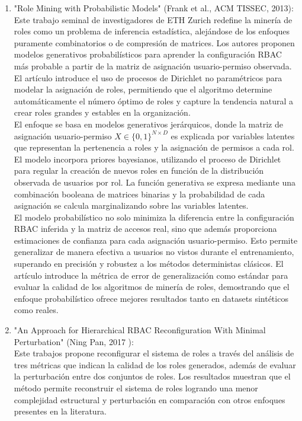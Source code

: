\documentclass[11pt,letterpaper]{article}
\begin{document}
\begin{enumerate}
    \item {"Role Mining with Probabilistic Models" (Frank et al., ACM TISSEC, 2013):\\}
    Este trabajo seminal de investigadores de ETH Zurich redefine la minería de roles como un problema de inferencia estadística, alejándose de los enfoques puramente combinatorios o de compresión de matrices. Los autores proponen modelos generativos probabilísticos para aprender la configuración RBAC más probable a partir de la matriz de asignación usuario-permiso observada. El artículo introduce el uso de procesos de Dirichlet no paramétricos para modelar la asignación de roles, permitiendo que el algoritmo determine automáticamente el número óptimo de roles y capture la tendencia natural a crear roles grandes y estables en la organización.\\

    El enfoque se basa en modelos generativos jerárquicos, donde la matriz de asignación usuario-permiso \( X \in \{0,1\}^{N \times D} \) es explicada por variables latentes que representan la pertenencia a roles y la asignación de permisos a cada rol. El modelo incorpora priores bayesianos, utilizando el proceso de Dirichlet para regular la creación de nuevos roles en función de la distribución observada de usuarios por rol. La función generativa se expresa mediante una combinación booleana de matrices binarias y la probabilidad de cada asignación se calcula marginalizando sobre las variables latentes.\\
    
    El modelo probabilístico no solo minimiza la diferencia entre la configuración RBAC inferida y la matriz de accesos real, sino que además proporciona estimaciones de confianza para cada asignación usuario-permiso. Esto permite generalizar de manera efectiva a usuarios no vistos durante el entrenamiento, superando en precisión y robustez a los métodos deterministas clásicos. El artículo introduce la métrica de error de generalización como estándar para evaluar la calidad de los algoritmos de minería de roles, demostrando que el enfoque probabilístico ofrece mejores resultados tanto en datasets sintéticos como reales.

    \item{"An Approach for Hierarchical RBAC Reconfiguration With Minimal Perturbation" (Ning Pan, 2017 ):\\}
    Este trabajos propone reconfigurar el sistema de roles a través del análisis de tres métricas que indican la calidad de los roles generados, además de evaluar la perturbación entre dos conjuntos de roles. Los resultados muestran que el método permite reconstruir el sistema de roles logrando una menor complejidad estructural y perturbación en comparación con otros enfoques presentes en la literatura.


\end{enumerate}
\end{document}
